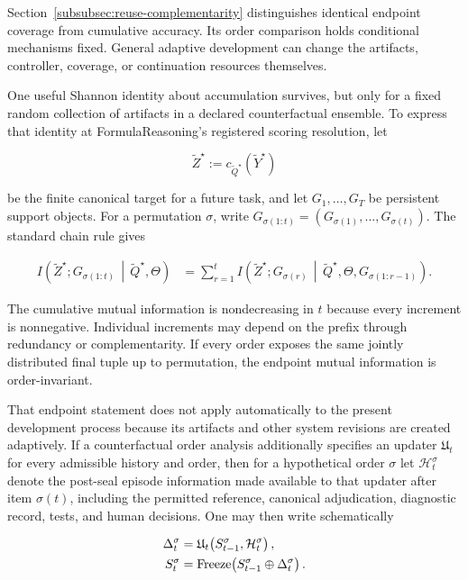 \documentclass[10pt]{article} %
\providecommand{\1}{\mathbf{1}}  %
\theoremstyle{remark}
\theoremstyle{definition}
\begin{document}
Section~\ref{subsubsec:reuse-complementarity} distinguishes identical
endpoint coverage from cumulative accuracy. Its order comparison holds
conditional mechanisms fixed. General adaptive development can change
the artifacts, controller, coverage, or continuation resources themselves.

One useful Shannon identity about accumulation survives, but only for a fixed random collection of artifacts in a declared counterfactual ensemble. To express that identity at FormulaReasoning's registered scoring resolution, let

\begin{equation}
\widetilde Z^\star
:=
c_{\widetilde Q^\star}(\widetilde Y^\star)
\end{equation}

be the finite canonical target for a future task, and let $G_1,\ldots,G_T$ be persistent support objects. For a permutation $\sigma$, write $G_{\sigma(1:t)}=(G_{\sigma(1)},\ldots,G_{\sigma(t)})$. The standard chain rule \citep[Section~2.5]{cover2006elements} gives

\begin{align}
I\!\left(
\widetilde Z^\star;
G_{\sigma(1:t)}
\,\middle|\,
\widetilde Q^\star,\Theta
\right)
&=
\sum_{r=1}^{t}
I\!\left(
\widetilde Z^\star;
G_{\sigma(r)}
\,\middle|\,
\widetilde Q^\star,\Theta,
G_{\sigma(1:r-1)}
\right).
\label{eq:artifact-information-chain-rule}
\end{align}

The cumulative mutual information is nondecreasing in $t$ because every increment is nonnegative. Individual increments may depend on the prefix through redundancy or complementarity. If every order exposes the same jointly distributed final tuple up to permutation, the endpoint mutual information is order-invariant.

That endpoint statement does not apply automatically to the present development process because its artifacts and other system revisions are created adaptively. If a counterfactual order analysis additionally specifies an updater $\mathfrak U_t$ for every admissible history and order, then for a hypothetical order $\sigma$ let $\mathcal H_t^\sigma$ denote the post-seal episode information made available to that updater after item $\sigma(t)$, including the permitted reference, canonical adjudication, diagnostic record, tests, and human decisions. One may then write schematically

\begin{align}
\Delta_t^\sigma
&=
\mathfrak U_t\!\left(
S_{t-1}^\sigma,
\mathcal H_t^\sigma
\right),
\notag\\
S_t^\sigma
&=
\operatorname{Freeze}\!\left(
S_{t-1}^\sigma\oplus\Delta_t^\sigma
\right).
\label{eq:adaptive-path}
\end{align}
\end{document}
